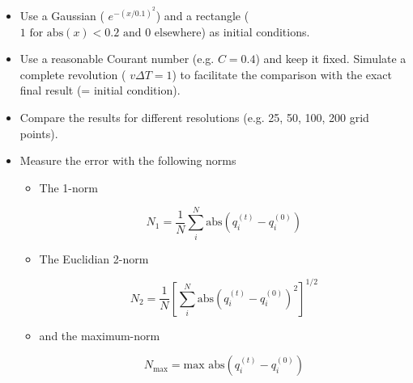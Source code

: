 \begin{itemize}

\item Use a Gaussian ( $e^{-\left(x/0.1\right)^2}$) and a rectangle ( $1 \mbox{ for abs}(x) < 0.2 \mbox{ and } 0 \mbox{ elsewhere}$) as initial conditions. 

\item  Use a reasonable Courant number (e.g. $C=0.4$) and keep it fixed. Simulate a complete 
revolution ( $v\Delta T    = 1$) to facilitate the comparison with the exact final result (= initial condition).

\item  Compare the results for different resolutions (e.g. 25, 50, 100, 200 grid points).

\item  Measure the error with the following norms

\begin{itemize}
  
\item The 1-norm

\begin{equation}
N_1 = \frac{1}{N} \sum_i^N \mbox{abs}\left(q_i^{(t)} - q_i^{(0)}\right)
\end{equation}

\item The Euclidian 2-norm 

\begin{equation}
N_2 = \frac{1}{N} \left[\sum_i^N \mbox{abs}\left(q_i^{(t)} - q_i^{(0)}\right)^2\right]^{1/2}
\end{equation}

\item and the maximum-norm 


\begin{equation}
N_\mathrm{max} = \mbox{max abs} \left(q_i^{(t)} - q_i^{(0)}\right)
\end{equation}

\end{itemize}

\end{itemize}
